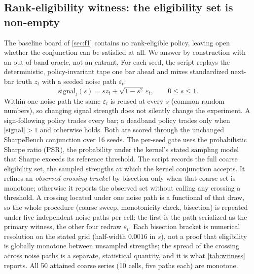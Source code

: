 \subsection{Rank-eligibility witness: the eligibility set is non-empty}\label{sec:witness}

The baseline board of \cref{sec:f1} contains no rank-eligible policy, leaving open whether the conjunction can be satisfied at all. We answer by construction with an out-of-band oracle, not an entrant. For each seed, the script replays the deterministic, policy-invariant tape one bar ahead and mixes standardized next-bar truth $z_t$ with a seeded noise path $\varepsilon_t$:
\[
\mathrm{signal}_t(s)=s z_t+\sqrt{1-s^2}\,\varepsilon_t,
\qquad 0\le s\le1.
\]
Within one noise path the same $\varepsilon_t$ is reused at every $s$ (common random numbers), so changing signal strength does not silently change the experiment. A sign-following policy trades every bar; a deadband policy trades only when $|\mathrm{signal}|>1$ and otherwise holds. Both are scored through the unchanged SharpeBench conjunction over 16 seeds. The per-seed gate uses the probabilistic Sharpe ratio (PSR), the probability under the kernel's stated sampling model that Sharpe exceeds its reference threshold. The script records the full coarse eligibility set, the sampled strengths at which the kernel conjunction accepts. It refines an \emph{observed crossing bracket} by bisection only when that coarse set is monotone; otherwise it reports the observed set without calling any crossing a threshold. A crossing located under one noise path is a functional of that draw, so the whole procedure (coarse sweep, monotonicity check, bisection) is repeated under five independent noise paths per cell: the first is the path serialized as the primary witness, the other four redraw $\varepsilon_t$. Each bisection bracket is numerical resolution on the stated grid (half-width $0.0016$ in $s$), not a proof that eligibility is globally monotone between unsampled strengths; the spread of the crossing across noise paths is a separate, statistical quantity, and it is what \cref{tab:witness} reports. All 50 attained coarse series (10 cells, five paths each) are monotone.

